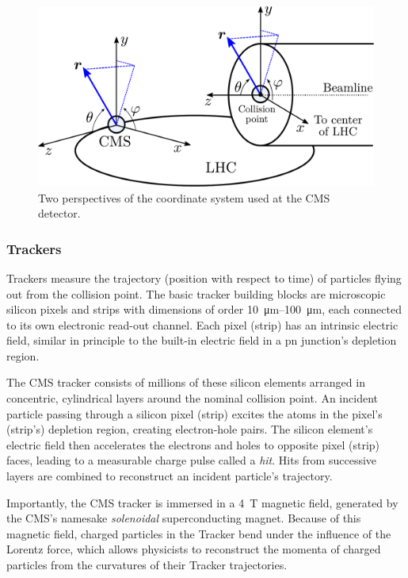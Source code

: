 \documentclass[11pt, a4paper]{article}
\begin{document}
\begin{figure}[htb!]
    \centering
    \includegraphics[width=0.9\linewidth]{vector/cms-coordinate-system.pdf}
    \caption{Two perspectives of the coordinate system used at the CMS detector.}
    \label{fig:cms-coordinate-system}
\end{figure}

\subsubsection{Trackers}
Trackers measure the trajectory (position with respect to time) of particles flying out from the collision point.
The basic tracker building blocks are microscopic silicon pixels and strips with dimensions of order \SIrange{10}{100}{\micro \meter}, each connected to its own electronic read-out channel.
Each pixel (strip) has an intrinsic electric field, similar in principle to the built-in electric field in a pn junction's depletion region.

The CMS tracker \cite{tracker-tdr} consists of millions of these silicon elements arranged in concentric, cylindrical layers around the nominal collision point.
An incident particle passing through a silicon pixel (strip) excites the atoms in the pixel's (strip's) depletion region, creating electron-hole pairs.
The silicon element's electric field then accelerates the electrons and holes to opposite pixel (strip) faces, leading to a measurable charge pulse called a \textit{hit}.
Hits from successive layers are combined to reconstruct an incident particle's trajectory.

Importantly, the CMS tracker is immersed in a \SI{4}{\tesla} magnetic field, generated by the CMS's namesake \textit{solenoidal} superconducting magnet.
Because of this magnetic field, charged particles in the Tracker bend under the influence of the Lorentz force, which allows physicists to reconstruct the momenta of charged particles from the curvatures of their Tracker trajectories.
\end{document}

